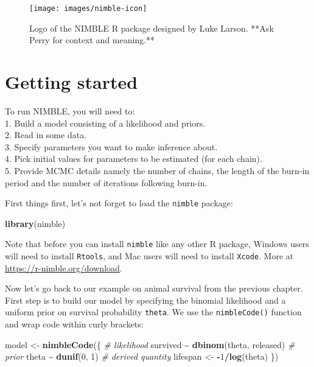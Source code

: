 \documentclass[
  12pt,
]{krantz}
\makeatletter
\newenvironment{Shaded}{\begin{snugshade}}{\end{snugshade}}
\newcommand{\CommentTok}[1]{\textcolor[rgb]{0.56,0.35,0.01}{\textit{#1}}}
\newcommand{\DecValTok}[1]{\textcolor[rgb]{0.00,0.00,0.81}{#1}}
\newcommand{\FunctionTok}[1]{\textcolor[rgb]{0.13,0.29,0.53}{\textbf{#1}}}
\newcommand{\NormalTok}[1]{#1}
\newcommand{\OtherTok}[1]{\textcolor[rgb]{0.56,0.35,0.01}{#1}}
\newcommand{\SpecialCharTok}[1]{\textcolor[rgb]{0.81,0.36,0.00}{\textbf{#1}}}
\newenvironment{kframe}{%
\medskip{}
\setlength{\fboxsep}{.8em}
 \def\at@end@of@kframe{}%
 \ifinner\ifhmode%
  \def\at@end@of@kframe{\end{minipage}}%
  \begin{minipage}{\columnwidth}%
 \fi\fi%
 \def\FrameCommand##1{\hskip\@totalleftmargin \hskip-\fboxsep
 \colorbox{shadecolor}{##1}\hskip-\fboxsep
     \hskip-\linewidth \hskip-\@totalleftmargin \hskip\columnwidth}%
 \MakeFramed {\advance\hsize-\width
   \@totalleftmargin\z@ \linewidth\hsize
   \@setminipage}}%
 {\par\unskip\endMakeFramed%
 \at@end@of@kframe}
\newenvironment{rmdblock}[1]
  {
  \begin{itemize}
  \renewcommand{\labelitemi}{
    \raisebox{-.7\height}[0pt][0pt]{
      {\setkeys{Gin}{width=3em,keepaspectratio}\texttt{[image: images/\#1]}}
    }
  }
  \setlength{\fboxsep}{1em}
  \begin{kframe}
  \item
  }
  {
  \end{kframe}
  \end{itemize}
  }
\newenvironment{rmdnote}
  {\begin{rmdblock}{note}}
  {\end{rmdblock}}
\makeatother
\begin{document}
\begin{figure}

{\centering \texttt{[image: images/nimble-icon]} 

}

\caption{Logo of the NIMBLE R package designed by Luke Larson. **Ask Perry for context and meaning.**}\label{fig:nimblelogo}
\end{figure}

\hypertarget{start-nimble}{%
\section{Getting started}\label{start-nimble}}

\begin{rmdnote}
To run NIMBLE, you will need to:\\
1. Build a model consisting of a likelihood and priors.\\
2. Read in some data.\\
3. Specify parameters you want to make inference about.\\
4. Pick initial values for parameters to be estimated (for each chain).\\
5. Provide MCMC details namely the number of chains, the length of the burn-in period and the number of iterations following burn-in.
\end{rmdnote}

First things first, let's not forget to load the \texttt{nimble} package:

\begin{Shaded}
\begin{Highlighting}[]
\FunctionTok{library}\NormalTok{(nimble)}
\end{Highlighting}
\end{Shaded}

Note that before you can install \texttt{nimble} like any other R package, Windows users will need to install \texttt{Rtools}, and Mac users will need to install \texttt{Xcode}. More at \url{https://r-nimble.org/download}.

Now let's go back to our example on animal survival from the previous chapter. First step is to build our model by specifying the binomial likelihood and a uniform prior on survival probability \texttt{theta}. We use the \texttt{nimbleCode()} function and wrap code within curly brackets:

\begin{Shaded}
\begin{Highlighting}[]
\NormalTok{model }\OtherTok{\textless{}{-}} \FunctionTok{nimbleCode}\NormalTok{(\{}
  \CommentTok{\# likelihood}
\NormalTok{  survived }\SpecialCharTok{\textasciitilde{}} \FunctionTok{dbinom}\NormalTok{(theta, released)}
  \CommentTok{\# prior}
\NormalTok{  theta }\SpecialCharTok{\textasciitilde{}} \FunctionTok{dunif}\NormalTok{(}\DecValTok{0}\NormalTok{, }\DecValTok{1}\NormalTok{)}
  \CommentTok{\# derived quantity}
\NormalTok{  lifespan }\OtherTok{\textless{}{-}} \SpecialCharTok{{-}}\DecValTok{1}\SpecialCharTok{/}\FunctionTok{log}\NormalTok{(theta)}
\NormalTok{\})}
\end{Highlighting}
\end{Shaded}
\end{document}
